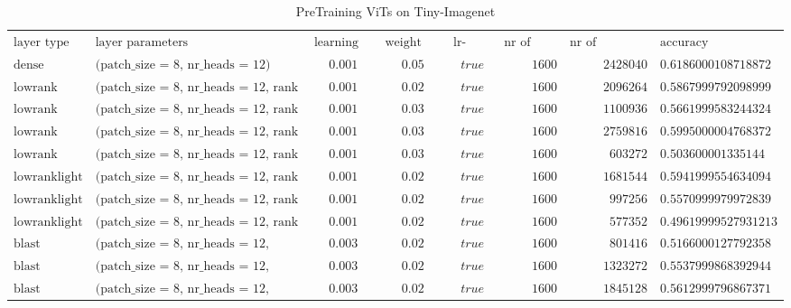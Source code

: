 \begin{sidewaystable}[h!]
\centering
\tiny
\caption{PreTraining ViTs on Tiny-Imagenet}
\label{tab:pt_results}
\begin{tabular}{llcccrrl}
$\text{layer type}$ & $\text{layer parameters}$ & $\text{learning rate}$ & $\text{weight decay}$ & $\text{lr-decay}$ & $\text{nr of epochs}$ & $\text{nr of parameters}$ & $\text{accuracy}$\\
$\text{dense}$ & $\text{(patch\_size = 8, nr\_heads = 12)}$ & $0.001$ & $0.05$ & $true$ & $1600$ & $2428040$ & $0.6186000108718872$\\
$\text{lowrank}$ & $\text{(patch\_size = 8, nr\_heads = 12, rank = 96)}$ & $0.001$ & $0.02$ & $true$ & $1600$ & $2096264$ & $0.5867999792098999$\\
$\text{lowrank}$ & $\text{(patch\_size = 8, nr\_heads = 12, rank = 48)}$ & $0.001$ & $0.03$ & $true$ & $1600$ & $1100936$ & $0.5661999583244324$\\
$\text{lowrank}$ & $\text{(patch\_size = 8, nr\_heads = 12, rank = 128)}$ & $0.001$ & $0.03$ & $true$ & $1600$ & $2759816$ & $0.5995000004768372$\\
$\text{lowrank}$ & $\text{(patch\_size = 8, nr\_heads = 12, rank = 24)}$ & $0.001$ & $0.03$ & $true$ & $1600$ & $603272$ & $0.503600001335144$\\
$\text{lowranklight}$ & $\text{(patch\_size = 8, nr\_heads = 12, rank = 96)}$ & $0.001$ & $0.02$ & $true$ & $1600$ & $1681544$ & $0.5941999554634094$\\
$\text{lowranklight}$ & $\text{(patch\_size = 8, nr\_heads = 12, rank = 48)}$ & $0.001$ & $0.02$ & $true$ & $1600$ & $997256$ & $0.5570999979972839$\\
$\text{lowranklight}$ & $\text{(patch\_size = 8, nr\_heads = 12, rank = 24)}$ & $0.001$ & $0.02$ & $true$ & $1600$ & $577352$ & $0.49619999527931213$\\
$\text{blast}$ & $\text{(patch\_size = 8, nr\_heads = 12, block\_size = 48, rank = 32)}$ & $0.003$ & $0.02$ & $true$ & $1600$ & $801416$ & $0.5166000127792358$\\
$\text{blast}$ & $\text{(patch\_size = 8, nr\_heads = 12, block\_size = 48, rank = 56)}$ & $0.003$ & $0.02$ & $true$ & $1600$ & $1323272$ & $0.5537999868392944$\\
$\text{blast}$ & $\text{(patch\_size = 8, nr\_heads = 12, block\_size = 48, rank = 80)}$ & $0.003$ & $0.02$ & $true$ & $1600$ & $1845128$ & $0.5612999796867371$\\
\end{tabular}

\end{sidewaystable}
